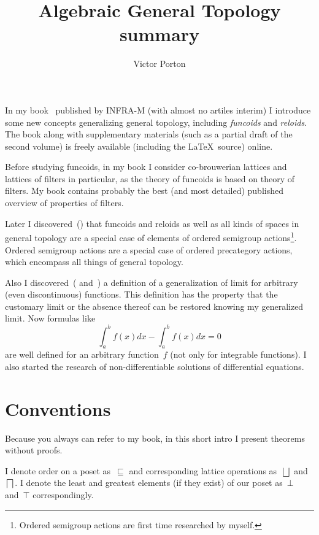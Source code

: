 \documentclass{amsart}
\begin{document}
\author{Victor Porton}

\title[Algebraic General Topology]{Algebraic General Topology summary}

\maketitle

In my book~\cite{volume-1-edition1} published by INFRA-M (with almost no artiles interim) I introduce some new concepts
generalizing general topology, including \emph{funcoids} and \emph{reloids}.
The book along with supplementary materials (such as a partial draft of the second volume)
is freely available (including the \LaTeX\ source) online.

Before studying funcoids, in my book I consider
co-brouwerian lattices and lattices of filters in particular,
as the theory of funcoids is based on theory of filters.
My book contains probably the best (and most detailed) published overview of properties of filters.

Later I discovered~(\cite{volume-3}) that funcoids and reloids as well as all
kinds of spaces in general topology are a special case of
elements of ordered semigroup actions\footnote{Ordered semigroup actions are first time researched by myself.}. Ordered semigroup actions are a special case of ordered precategory actions, which encompass all things of general topology.

Also I discovered~(\cite{volume-1-edition1} and~\cite{limit}) a definition of a generalization of limit for arbitrary (even discontinuous) functions. This definition has the property that the customary limit or the absence thereof can be restored knowing my generalized limit. Now formulas like \[ \int_a^b f(x)dx - \int_a^b f(x)dx = 0 \] are well defined for an arbitrary function~$f$ (not only for integrable functions). I also started the research of non-differentiable solutions of differential equations.

\section{Conventions}

Because you always can refer to my book, in this short intro I present theorems without proofs.

I denote order on a poset as~$\sqsubseteq$ and corresponding lattice operations as~$\bigsqcup$ and~$\bigsqcap$.
I denote the least and greatest elements (if they exist) of our poset as~$\bot$ and~$\top$ correspondingly.
\end{document}
